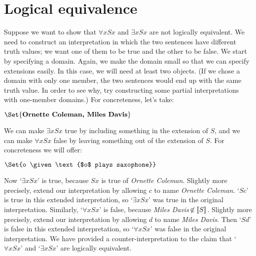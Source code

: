 \section{Logical equivalence}
Suppose we want to show that $\forall x Sx$ and $\exists x Sx$ are not logically equivalent. We need to construct an interpretation in which the two sentences have different truth values; we want one of them to be true and the other to be false. We start by specifying a domain. Again, we make the domain small so that we can specify extensions easily. In this case, we will need at least two objects. (If we chose a domain with only one member, the two sentences would end up with the same truth value. In order to see why, try constructing some partial interpretations with one-member domains.) For concreteness, let's take:
	\begin{interp}
		\item[\domain] $\Set{\text{\emph{Ornette Coleman, Miles Davis}}}$
	\end{interp}
We can make $\exists x Sx$ true by including something in the extension of $S$, and we can make $\forall x Sx$ false by leaving something out of the extension of $S$. For concreteness we will offer:
	\begin{interp}
		\item[\denote{S}] $\Set{o \given \text{$o$ plays saxophone}}$
	\end{interp}
Now `$\exists x Sx$' is true, because $Sx$ is true of \emph{Ornette Coleman}. Slightly more precisely, extend our interpretation by allowing $c$ to name \emph{Ornette Coleman}.  `$Sc$' is true in this extended interpretation, so `$\exists x Sx$' was true in the original interpretation. Similarly, `$\forall x Sx$' is false, because \emph{Miles Davis}$\,\not\in\llbracket S\rrbracket$. Slightly more precisely, extend our interpretation by allowing $d$ to name \emph{Miles Davis}. Then `$Sd$' is false in this extended interpretation, so `$\forall x Sx$' was false in the original interpretation. We have provided a counter-interpretation to the claim that `$\forall x Sx$' and `$\exists x Sx$' are logically equivalent.

